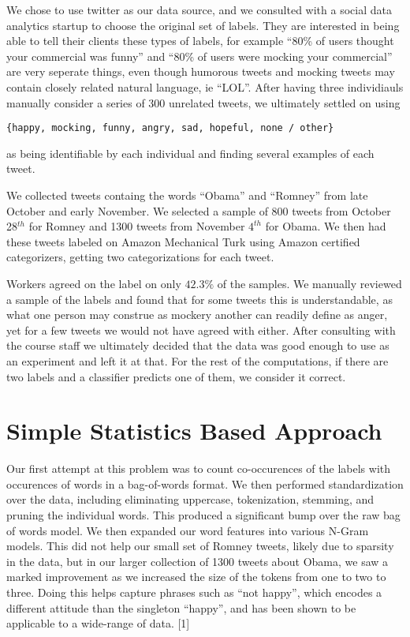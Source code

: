 \documentclass[11pt]{article}
\begin{document}
We chose to use twitter as our data source, and we consulted with a social data analytics startup to choose the original set of labels. They are interested in being able to tell their clients these types of labels, for example ``80\% of users thought your commercial was funny'' and ``80\% of users were mocking your commercial'' are very seperate things, even though humorous tweets and mocking tweets may contain closely related natural language, ie ``LOL''. After having three individiauls manually consider a series of 300 unrelated tweets, we ultimately settled on using 
\begin{center}
\verb|{happy, mocking, funny, angry, sad, hopeful, none / other}|
\end{center}
as being identifiable by each individual and finding several examples of each tweet.

We collected tweets containg the words ``Obama'' and ``Romney'' from late October and early November. We selected a sample of 800 tweets from October 28$^{th}$ for Romney and 1300 tweets from November $4^{th}$ for Obama. We then had these tweets labeled on Amazon Mechanical Turk using Amazon certified categorizers, getting two categorizations for each tweet.

Workers agreed on the label on only $42.3\%$ of the samples. We manually reviewed a sample of the labels and found that for some tweets this is understandable, as what one person may construe as mockery another can readily define as anger, yet for a few tweets we would not have agreed with either. After consulting with the course staff we ultimately decided that the data was good enough to use as an experiment and left it at that. For the rest of the computations, if there are two labels and a classifier predicts one of them, we consider it correct.

\section{Simple Statistics Based Approach}


Our first attempt at this problem was to count co-occurences of the labels with occurences of words in a bag-of-words format. We then performed standardization over the data, including eliminating uppercase, tokenization, stemming, and pruning the individual words. This produced a significant bump over the raw bag of words model. We then expanded our word features into various N-Gram models. This did not help our small set of Romney tweets, likely due to sparsity in the data, but in our larger collection of 1300 tweets about Obama, we saw a marked improvement as we increased the size of the tokens from one to two to three. Doing this helps capture phrases such as ``not happy'', which encodes a different attitude than the singleton ``happy'', and has been shown to be applicable to a wide-range of data. [1] 
\end{document}
